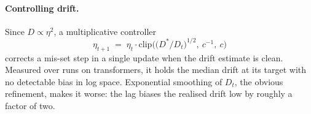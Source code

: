 \paragraph{Controlling drift.} Since $D \propto \eta^2$, a multiplicative controller
\begin{equation}
  \eta_{t+1} \;=\; \eta_t \cdot \mathrm{clip}\Big( \big( D^{*} / D_t \big)^{1/2},\ c^{-1},\ c \Big)
\end{equation}
corrects a mis-set step in a single update when the drift estimate is clean. Measured over runs on
transformers, it holds the median drift at its target with no detectable bias in log space.
Exponential smoothing of $D_t$, the obvious refinement, makes it worse: the lag biases the realised
drift low by roughly a factor of two.
